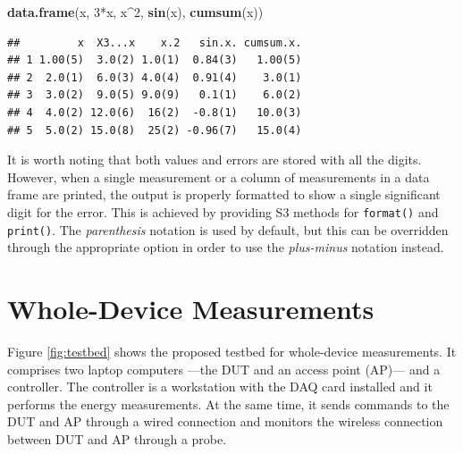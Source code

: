 \documentclass[twoside,nohyper]{tufte-book}
\newenvironment{Shaded}{}{}
\newcommand{\DecValTok}[1]{\textcolor[rgb]{0.25,0.63,0.44}{#1}}
\newcommand{\KeywordTok}[1]{\textcolor[rgb]{0.00,0.44,0.13}{\textbf{#1}}}
\newcommand{\NormalTok}[1]{#1}
\newcommand{\OperatorTok}[1]{\textcolor[rgb]{0.40,0.40,0.40}{#1}}
\theoremstyle{definition}
\theoremstyle{definition}
\theoremstyle{definition}
\theoremstyle{remark}
\begin{document}
\begin{Shaded}
\begin{Highlighting}[]
\KeywordTok{data.frame}\NormalTok{(x, }\DecValTok{3}\OperatorTok{*}\NormalTok{x, x}\OperatorTok{^}\DecValTok{2}\NormalTok{, }\KeywordTok{sin}\NormalTok{(x), }\KeywordTok{cumsum}\NormalTok{(x))}
\end{Highlighting}
\end{Shaded}

\begin{verbatim}
##         x  X3...x    x.2   sin.x. cumsum.x.
## 1 1.00(5)  3.0(2) 1.0(1)  0.84(3)   1.00(5)
## 2  2.0(1)  6.0(3) 4.0(4)  0.91(4)    3.0(1)
## 3  3.0(2)  9.0(5) 9.0(9)   0.1(1)    6.0(2)
## 4  4.0(2) 12.0(6)  16(2)  -0.8(1)   10.0(3)
## 5  5.0(2) 15.0(8)  25(2) -0.96(7)   15.0(4)
\end{verbatim}

It is worth noting that both values and errors are stored with all the
digits. However, when a single measurement or a column of measurements
in a data frame are printed, the output is properly formatted to show a
single significant digit for the error. This is achieved by providing S3
methods for \texttt{format()} and \texttt{print()}. The
\emph{parenthesis} notation is used by default, but this can be
overridden through the appropriate option in order to use the
\emph{plus-minus} notation instead.

\hypertarget{whole-device-measurements}{%
\section{Whole-Device Measurements}\label{whole-device-measurements}}

Figure \ref{fig:testbed} shows the proposed testbed for whole-device
measurements. It comprises two laptop computers ---the DUT and an access
point (AP)--- and a controller. The controller is a workstation with the
DAQ card installed and it performs the energy measurements. At the same
time, it sends commands to the DUT and AP through a wired connection and
monitors the wireless connection between DUT and AP through a probe.
\end{document}
